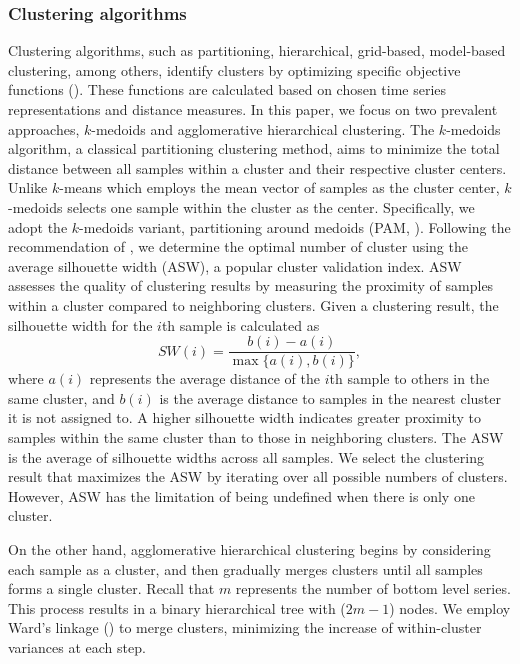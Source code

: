 \documentclass[a4paper,review,12pt,authoryear]{elsarticle}
\begin{document}
\subsubsection{Clustering algorithms}
Clustering algorithms, such as partitioning, hierarchical, grid-based, model-based clustering, among others, identify clusters by optimizing specific objective functions (\citealp{aghabozorgiTimeseriesClusteringDecade2015a}). These functions are calculated based on chosen time series representations and distance measures.
In this paper, we focus on two prevalent approaches, $k$-medoids and agglomerative hierarchical clustering. The $k$-medoids algorithm, a classical partitioning clustering method, aims to minimize the total distance between all samples within a cluster and their respective cluster centers. 
Unlike $k$-means which employs the mean vector of samples as the cluster center, $k$-medoids selects one sample within the cluster as the center. 
Specifically, we adopt the $k$-medoids variant, partitioning around medoids (PAM, \citealp{PartitioningMedoidsProgram1990}).
Following the recommendation of \cite{PartitioningMedoidsProgram1990}, we determine the optimal number of cluster using the average silhouette width (ASW), a popular cluster validation index.
ASW assesses the quality of clustering results by measuring the proximity of samples within a cluster compared to neighboring clusters.
Given a clustering result, the silhouette width for the $i$th sample is calculated as 
\[
  SW(i) = \frac{b(i)-a(i)}{\max\{a(i), b(i)\}},  
\]
where $a(i)$ represents the average distance of the $i$th sample to others in the same cluster, and $b(i)$ is the average distance to samples in the nearest cluster it is not assigned to. A higher silhouette width indicates greater proximity to samples within the same cluster than to those in neighboring clusters. The ASW is the average of silhouette widths across all samples. We select the clustering result that maximizes the ASW by iterating over all possible numbers of clusters. However, ASW has the limitation of being undefined when there is only one cluster. 

On the other hand, agglomerative hierarchical clustering begins by considering each sample as a cluster, and then gradually merges clusters until all samples forms a single cluster. Recall that $m$ represents the number of bottom level series. 
This process results in a binary hierarchical tree with ($2m-1$) nodes. We employ Ward's linkage (\citealp{murtaghWardHierarchicalAgglomerative2014a}) to merge clusters, minimizing the increase of within-cluster variances at each step. 
\end{document}
